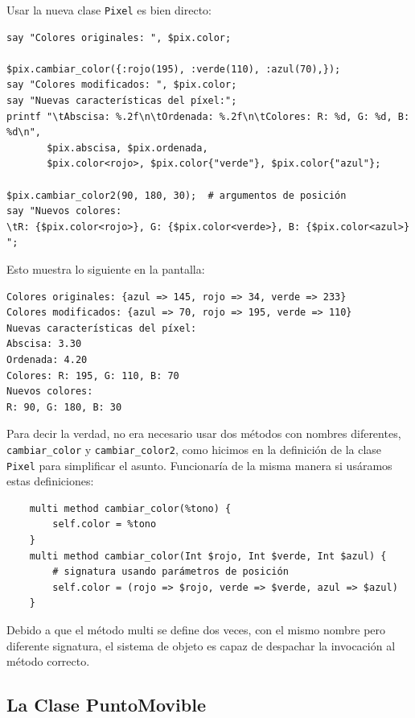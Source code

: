 Usar la nueva clase {\tt Pixel} es bien directo:

\begin{lstlisting}
say "Colores originales: ", $pix.color;

$pix.cambiar_color({:rojo(195), :verde(110), :azul(70),});
say "Colores modificados: ", $pix.color;
say "Nuevas características del píxel:";
printf "\tAbscisa: %.2f\n\tOrdenada: %.2f\n\tColores: R: %d, G: %d, B: %d\n",
       $pix.abscisa, $pix.ordenada, 
       $pix.color<rojo>, $pix.color{"verde"}, $pix.color{"azul"};

$pix.cambiar_color2(90, 180, 30);  # argumentos de posición
say "Nuevos colores:  
\tR: {$pix.color<rojo>}, G: {$pix.color<verde>}, B: {$pix.color<azul>} ";
\end{lstlisting}

Esto muestra lo siguiente en la pantalla:

\begin{lstlisting}
Colores originales: {azul => 145, rojo => 34, verde => 233}
Colores modificados: {azul => 70, rojo => 195, verde => 110}
Nuevas características del píxel:
Abscisa: 3.30
Ordenada: 4.20
Colores: R: 195, G: 110, B: 70
Nuevos colores:  
R: 90, G: 180, B: 30 
\end{lstlisting}

Para decir la verdad, no era necesario usar dos métodos con
nombres diferentes, \verb|cambiar_color| y \verb|cambiar_color2|,
como hicimos en la definición de la clase {\tt Pixel} para 
simplificar el asunto. Funcionaría de la misma manera si usáramos
estas definiciones:

\begin{lstlisting}
    multi method cambiar_color(%tono) {
        self.color = %tono
    }
    multi method cambiar_color(Int $rojo, Int $verde, Int $azul) {
        # signatura usando parámetros de posición
        self.color = (rojo => $rojo, verde => $verde, azul => $azul)
    }
\end{lstlisting} 

Debido a que el método multi se define dos veces, con el 
mismo nombre pero diferente signatura, el sistema de objeto
es capaz de despachar la invocación al método correcto.


\subsection{La Clase PuntoMovible}

